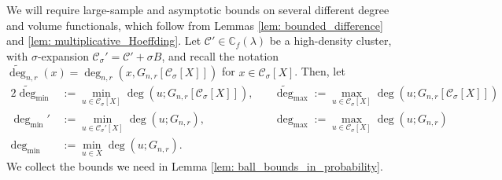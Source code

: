 \documentclass[11pt,twoside]{article}
\newcommand{\1}{\mathbf{1}}
\newcommand{\Xbf}{X}             %
\newcommand{\Cbb}{\mathbb{C}}
\newcommand{\Cset}{\mathcal{C}}
\newcommand{\Csig}{\Cset_{\sigma}}
\newcommand{\degminpr}{\deg_{\min}'}
\newcommand{\degminwt}{\widetilde{\deg}_{\min}}
\newcommand{\degmaxwt}{\widetilde{\deg}_{\max}}
\newcommand{\degmax}{\deg_{\max}}
\newcommand{\degmin}{\deg_{\min}}
\begin{document}
We will require large-sample and asymptotic bounds on several different degree and volume functionals, which follow from Lemmas \ref{lem: bounded_difference} and \ref{lem: multiplicative_Hoeffding}. Let $\Cset' \in \Cbb_f(\lambda)$ be a high-density cluster, with $\sigma$-expansion $\Csig' = \Cset' + \sigma B$, and recall the notation $\widetilde{\deg}_{n,r}(x) = \deg_{n,r}(x,G_{n,r}[\Csig[\Xbf]])$ for $x \in \Csig[\Xbf]$. Then, let
\begin{alignat*}{2}
\degminwt & := \min_{u \in \Csig[\Xbf]} \deg(u; G_{n,r}\left[\Csig[\Xbf]\right]),~ && \degmaxwt := \max_{u \in \Csig[\Xbf]} \deg(u; G_{n,r}\left[\Csig[\Xbf]\right]) \\ 
\degminpr & := \min_{u \in \Csig'[\Xbf]} \deg(u; G_{n,r}),~ && \degmax := \max_{u \in \Csig[\Xbf]} \deg(u; G_{n,r}) \\
\degmin & := \min_{u \in \Xbf} \deg(u; G_{n,r}).
\end{alignat*}
We collect the bounds we need in Lemma \ref{lem: ball_bounds_in_probability}.
\end{document}
